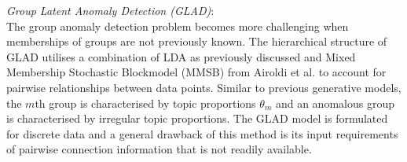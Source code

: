 % 
% 
{\it Group Latent Anomaly Detection (GLAD)}:\\ 
The group anomaly detection problem becomes more challenging when memberships of groups are not previously known.  The  hierarchical structure  of GLAD utilises a combination of LDA as previously discussed and Mixed Membership Stochastic Blockmodel (MMSB) from Airoldi et al.  \cite{MMSB} to account for pairwise relationships between data points.  Similar to previous generative models, the $m$th group  is characterised by  topic proportions $\theta_{m}$ and an anomalous group is characterised by irregular topic proportions. %
 The GLAD model is formulated for discrete data and a general drawback of this method is its input requirements of pairwise connection information that is not readily available. 

